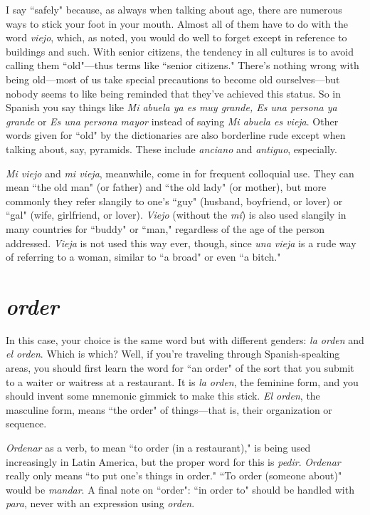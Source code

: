 I say ``safely" because, as always when talking about age, there
are numerous ways to stick your foot in your mouth. Almost all of
them have to do with the word \emph{viejo}, which, as noted, you would do
well to forget except in reference to buildings and such. With senior
citizens, the tendency in all cultures is to avoid calling them ``old"---thus terms like ``senior citizens." There's nothing wrong with being
old---most of us take special precautions to become old ourselves---but
nobody seems to like being reminded that they've achieved this status.
So in Spanish you say things like \emph{Mi abuela ya es muy grande, Es
	una persona ya grande} or  \emph{Es una persona mayor} instead of saying \emph{Mi
	abuela es vieja}. Other words given for ``old" by the dictionaries are
also borderline rude except when talking about, say, pyramids. These
include \emph{anciano} and \emph{antiguo}, especially.

\emph{Mi viejo} and \emph{mi vieja}, meanwhile, come in for frequent colloquial use. They can mean ``the old man" (or father) and ``the old lady"
(or mother), but more commonly they refer slangily to one's ``guy"
(husband, boyfriend, or lover) or ``gal" (wife, girlfriend, or lover). \emph{Viejo}
(without the \emph{mí}) is also used slangily in many countries for ``buddy" or
``man," regardless of the age of the person addressed. \emph{Vieja} is not used
this way ever, though, since \emph{una vieja} is a rude way of referring to a
woman, similar to ``a broad" or even ``a bitch."

\section{\emph{order}}

In this case, your choice is the same word but with different
genders: \emph{la orden} and \emph{el orden}. Which is which? Well, if you're traveling through Spanish-speaking areas, you should first learn the word for
``an order" of the sort that you submit to a waiter or waitress at a restaurant. It is \emph{la orden}, the feminine form, and you should invent some
mnemonic gimmick to make this stick. \emph{El orden}, the masculine form,
means ``the order" of things---that is, their organization or sequence.

\emph{Ordenar} as a verb, to mean ``to order (in a restaurant)," is being used
increasingly in Latin America, but the proper word for this is \emph{pedir}.
\emph{Ordenar} really only means ``to put one's things in order." ``To order
(someone about)" would be \emph{mandar}. A final note on ``order": ``in order
to" should be handled with \emph{para}, never with an expression using
\emph{orden}.

